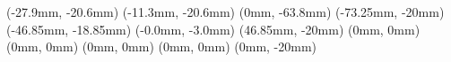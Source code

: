 \JoinCoffins \result \topBox
\JoinCoffins {} \badge[r, b](-27.9mm, -20.6mm)
\JoinCoffins {} \pku[l, b](-11.3mm, -20.6mm)
\JoinCoffins {} \headingText[hc, b](0mm, -63.8mm)
\JoinCoffins {} \titleText[l, t](-73.25mm, -20mm)
\JoinCoffins {} \chineseTitleText[l, t](-46.85mm, -18.85mm)
\JoinCoffins {} \englishTitleText[l, t](-0.0mm, -3.0mm)
\JoinCoffins {} \nameText[hc, t](46.85mm, -20mm)
\JoinCoffins {} \studentIDText[hc, t](0mm, 0mm)
\JoinCoffins {} \schoolText[hc, t](0mm, 0mm)
\JoinCoffins {} \majorText[hc, t](0mm, 0mm)
\JoinCoffins {} \advisorText[hc, t](0mm, 0mm)
\JoinCoffins {} \dateText[hc, t](0mm, -20mm)


\thispagestyle{empty}
\noindent\TypesetCoffin \result
\restoregeometry